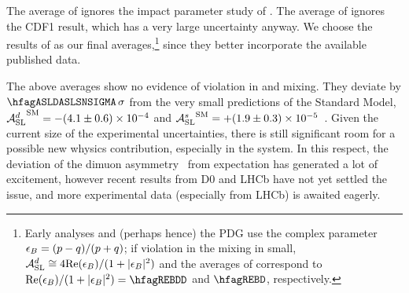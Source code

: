 The average of  %
ignores the impact parameter study of \dzero.
The average of  ignores the CDF1 
result, which has a very large uncertainty anyway.
We choose the results of 
as our final averages,\footnote{
  \label{foot:life_mix:epsilon_B}
  Early analyses and (perhaps hence) the PDG use the complex
  parameter $\epsilon_{B} = (p-q)/(p+q)$; if \CP violation in the mixing in small,
  ${\cal A}_{\rm SL}^d \cong 4 {\rm Re}(\epsilon_{B})/(1+|\epsilon_{B}|^2)$ and the averages of
  correspond to ${\rm Re}(\epsilon_{\B})/(1+|\epsilon_{\B}|^2)=\hfagREBDD$ %
  and $\hfagREBD$, respectively.}
since they better incorporate the available published data. 

The above averages show no evidence of \CP violation in \Bd and \Bs mixing.
They deviate by $\hfagASLDASLSNSIGMA\,\sigma$ from the very small predictions of the Standard Model, 
${{\cal A}_{\rm SL}^d}^{\rm SM} = -(4.1\pm 0.6)\times 10^{-4}$ and 
${{\cal A}_{\rm SL}^s}^{\rm SM} = +(1.9\pm 0.3)\times 10^{-5}$~\cite{Lenz:2011ti,*Lenz:2006hd}.
Given the current size of the experimental uncertainties, there is still significant room for a possible new whysics contribution, especially in the \Bs system. 
In this respect, the deviation of the \dzero dimuon
asymmetry~\cite{Abazov:2013uma,*Abazov:2011yk_mod,*Abazov:2010hv_mod_cont,*Abazov:2010hj_mod_cont,*Abazov:2011yk_cont}
from expectation has generated a lot of excitement, however recent results from D0 and LHCb 
have not yet settled the issue, and more experimental data (especially from LHCb) is awaited eagerly. 

